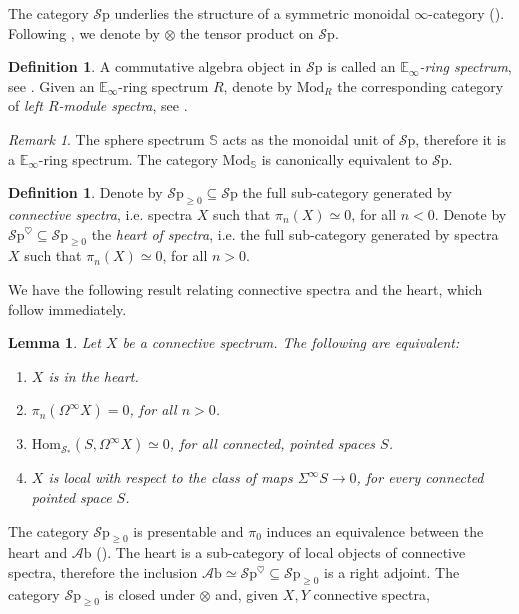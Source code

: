 \documentclass[10pt]{amsart}
\newcommand{\bE}{\mathbb{E}}
\newcommand{\s}{\mathscr{S}}
\newcommand{\bS}{\mathbb{S}}
\newcommand{\Hom}{\mathrm{Hom}}
\newcommand{\Sp}{\mathscr{S}\mathrm{p}}
\newcommand{\Mod}{\mathrm{Mod}}
\newcommand{\Ab}{\mathscr{A}\mathrm{b}}
\newtheorem{lemma}[equation]{Lemma}
\theoremstyle{definition}
\newtheorem{definition}[equation]{Definition}
\theoremstyle{remark}
\newtheorem{remark}[equation]{Remark}
\numberwithin{equation}{section}
\begin{document}
  The category $\Sp$ underlies the structure of a symmetric monoidal $\infty$-category (\cite[Corollary 4.8.2.19]{lurie2017ha}). Following \cite{lurie2017ha}, we denote by $\otimes$ the tensor product on $\Sp$.
  \begin{definition}
    A commutative algebra object in $\Sp$ is called an \emph{$\bE_\infty$-ring spectrum}, see \cite[Definition 7.1.0.1]{lurie2017ha}. Given an $\bE_\infty$-ring spectrum $R$, denote by $\Mod_R$ the corresponding category of \emph{left $R$-module spectra}, see \cite[Definition 7.1.1.2]{lurie2017ha}. 
  \end{definition}
  \begin{remark}
    The sphere spectrum $\bS$ acts as the monoidal unit of $\Sp$, therefore it is a $\bE_\infty$-ring spectrum. The category $\Mod_{\bS}$ is canonically equivalent to $\Sp$. 
  \end{remark}
    \begin{definition}
    Denote by $\Sp_{\geq0}\subseteq\Sp$ the full sub-category generated by \emph{connective spectra}, i.e. spectra $X$ such that $\pi_n(X)\simeq0$, for all $n<0$. Denote by $\Sp^\heartsuit\subseteq\Sp_{\geq0}$ the \emph{heart of spectra}, i.e. the full sub-category generated by spectra $X$ such that $\pi_n(X)\simeq0$, for all $n>0$.
  \end{definition}
  We have the following result relating connective spectra and the heart, which follow immediately.
  \begin{lemma}
  Let $X$ be a connective spectrum. The following are equivalent:
  \begin{enumerate}
    \item $X$ is in the heart. 
    \item $\pi_n(\Omega^\infty X)=0$, for all $n>0$.
    \item $\Hom_{\s_*}(S,\Omega^\infty X)\simeq0$, for all connected, pointed spaces $S$.
    \item $X$ is local with respect to the class of maps $\Sigma^\infty S\to0$, for every connected pointed space $S$.
  \end{enumerate}
  \end{lemma}

  The category $\Sp_{\geq0}$ is presentable and $\pi_0$ induces an equivalence between the heart and $\Ab$ (\cite[Proposition 1.4.3.6]{lurie2017ha}). The heart is a sub-category of local objects of connective spectra, therefore the inclusion $\Ab\simeq\Sp^\heartsuit\subseteq\Sp_{\geq0}$ is a right adjoint. The category $\Sp_{\geq0}$ is closed under $\otimes$ and, given $X,Y$ connective spectra, 
\end{document}
